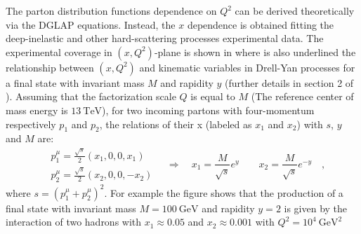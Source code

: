 The parton distribution functions dependence on $Q^2$ can be derived theoretically via the DGLAP equations. Instead, the $x$ dependence is obtained fitting the deep-inelastic and other hard-scattering processes experimental data.
The experimental coverage in $(x,Q^2)$-plane is shown in  
where is also underlined the relationship between $(x,Q^2)$ and kinematic variables in Drell-Yan processes for a final state with invariant mass $M$ and rapidity $y$ (further details in section 2 of \cite{Campbell2006}). Assuming that the factorization scale $Q$ is equal to $M$ (The reference center of mass energy is $13\ \mathrm{TeV}$), for two incoming partons with four-momentum respectively $p_1$ and $p_2$, the relations of their x (labeled as $x_1$ and $x_2$) with $s$, $y$ and $M$ are:  
\begin{equation}
	\begin{aligned}
		&p_1^\mu=\frac{\sqrt{s}}{2}(x_1,0,0,x_1)\\
&p_2^\mu=\frac{\sqrt{s}}{2}(x_2,0,0,-x_2)
	\end{aligned} \quad\Longrightarrow\quad x_1=\frac{M}{\sqrt{s}}e^y\qquad x_2=\frac{M}{\sqrt{s}}e^{-y} \quad ,
\end{equation}
where  $s=(p_1^\mu+p_2^\mu)^2$. For example the figure shows that the production of a final state with invariant mass $M=100\ \mathrm{GeV}$ and rapidity $y=2$ is given by the interaction of two hadrons with $x_1\approx0.05$  and $x_2\approx0.001$ with $Q^2=10^4\ \mathrm{GeV^2}$


